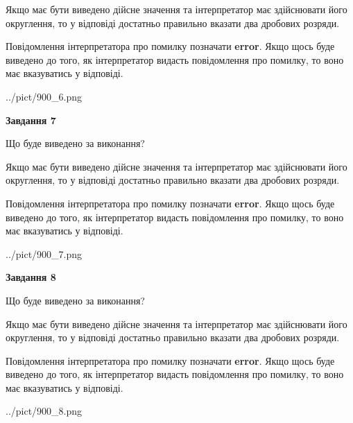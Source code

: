 \documentclass[12pt, ukrainian]{article}
\begin{document}
{\begin {Large}
Якщо має бути виведено дійсне значення та інтерпретатор має здійснювати його округлення, 
то у відповіді достатньо правильно вказати два дробових розряди.

Повідомлення інтерпретатора про помилку позначати \textbf{error}.
Якщо щось буде виведено до того, як інтерпретатор видасть повідомлення про помилку, 
то воно має вказуватись у відповіді. \par

\begin{center}
	{../pict/900_6.png}
\end{center}
\newpage

{\begin {center}\textbf{Завдання 7}\end {center}}\par
Що буде виведено за виконання? \par

Якщо має бути виведено дійсне значення та інтерпретатор має здійснювати його округлення, 
то у відповіді достатньо правильно вказати два дробових розряди.

Повідомлення інтерпретатора про помилку позначати \textbf{error}.
Якщо щось буде виведено до того, як інтерпретатор видасть повідомлення про помилку, 
то воно має вказуватись у відповіді. \par

\begin{center}
	{../pict/900_7.png}
\end{center}
\newpage

{\begin {center}\textbf{Завдання 8}\end {center}}\par
Що буде виведено за виконання? \par

Якщо має бути виведено дійсне значення та інтерпретатор має здійснювати його округлення, 
то у відповіді достатньо правильно вказати два дробових розряди.

Повідомлення інтерпретатора про помилку позначати \textbf{error}.
Якщо щось буде виведено до того, як інтерпретатор видасть повідомлення про помилку, 
то воно має вказуватись у відповіді. \par

\begin{center}
	{../pict/900_8.png}
\end{center}
\newpage


\end{Large}}
\end{document}
